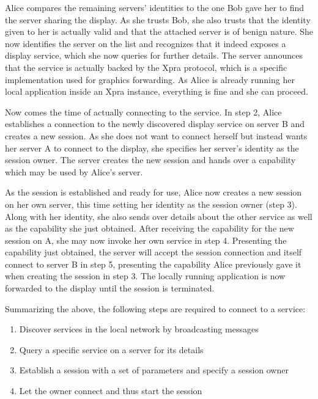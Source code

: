Alice compares the remaining servers' identities to the one Bob gave her to find the server sharing the display.
As she trusts Bob, she also trusts that the identity given to her is actually valid and that the attached server is of benign nature.
She now identifies the server on the list and recognizes that it indeed exposes a display service, which she now queries for further details.
The server announces that the service is actually backed by the Xpra protocol, which is a specific implementation used for graphics forwarding.
As Alice is already running her local application inside an Xpra instance, everything is fine and she can proceed.

Now comes the time of actually connecting to the service.
In step 2, Alice establishes a connection to the newly discovered display service on server B and creates a new session.
As she does not want to connect herself but instead wants her server A to connect to the display, she specifies her server's identity as the session owner.
The server creates the new session and hands over a capability which may be used by Alice's server.

As the session is established and ready for use, Alice now creates a new session on her own server, this time setting her identity as the session owner (step 3).
Along with her identity, she also sends over details about the other service as well as the capability she just obtained.
After receiving the capability for the new session on A, she may now invoke her own service in step 4.
Presenting the capability just obtained, the server will accept the session connection and itself connect to server B in step 5, presenting the capability Alice previously gave it when creating the session in step 3.
The locally running application is now forwarded to the display until the session is terminated.

\bigskip

Summarizing the above, the following steps are required to connect to a service:
\begin{enumerate}
    \item Discover services in the local network by broadcasting messages
    \item Query a specific service on a server for its details
    \item Establish a session with a set of parameters and specify a session owner
    \item Let the owner connect and thus start the session
\end{enumerate}

